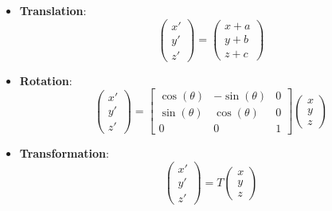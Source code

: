 \begin{itemize}
    \item \textbf{Translation}:
    \begin{equation}\label{eq:translation}
        \begin{pmatrix}
        x' \\
        y' \\
        z'
        \end{pmatrix}
        =
        \begin{pmatrix}
        x + a \\
        y + b \\
        z + c
        \end{pmatrix}
    \end{equation}
    
    \item \textbf{Rotation}:
    \begin{equation}\label{eq:rotation}
        \begin{pmatrix}
        x' \\
        y' \\
        z'
        \end{pmatrix}
        =
        \begin{bmatrix}
        \cos(\theta) & -\sin(\theta) & 0 \\
        \sin(\theta) & \cos(\theta) & 0 \\
        0 & 0 & 1
        \end{bmatrix}
        \begin{pmatrix}
        x \\
        y \\
        z
        \end{pmatrix}
    \end{equation}
    
    \item \textbf{Transformation}:
    \begin{equation}\label{eq:transformation}
        \begin{pmatrix}
        x' \\
        y' \\
        z'
        \end{pmatrix}
        =
        T
        \begin{pmatrix}
        x \\
        y \\
        z
        \end{pmatrix}
    \end{equation}
\end{itemize}

